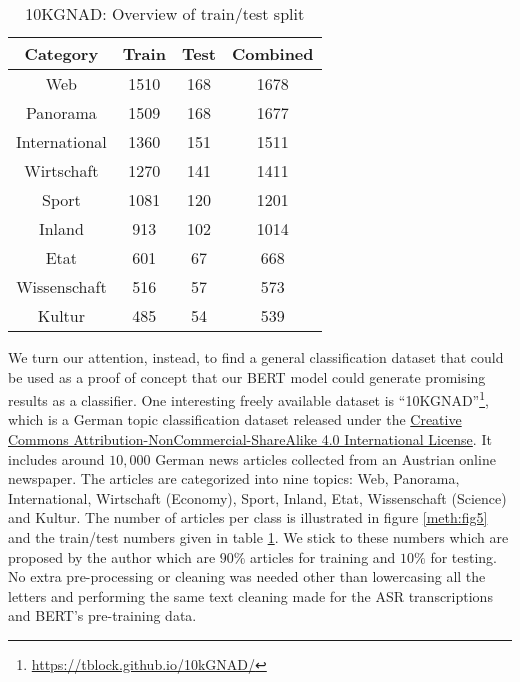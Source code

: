 \begin{table}[!ht]
	\centering
	\begin{tabular}{|c|c|c|c|}
		\hline
		Category		& Train	& Test  & Combined  \\ \hline
		Web				& 1510 	& 168	& 1678 		\\ \hline
		Panorama 		& 1509 	& 168	& 1677		\\ \hline
		International 	& 1360	& 151	& 1511		\\ \hline
		Wirtschaft 		& 1270	& 141	& 1411		\\ \hline
		Sport 			& 1081	& 120	& 1201		\\ \hline
		Inland 			& 913	& 102	& 1014		\\ \hline
		Etat 			& 601	& 67	& 668		\\ \hline
		Wissenschaft 	& 516	& 57	& 573		\\ \hline
		Kultur 			& 485	& 54	& 539		\\ \hline
		
	\end{tabular}
	\caption{10KGNAD: Overview of train/test split}
	\label{meth:table5}
\end{table}



We turn our attention, instead, to find a general classification dataset that could be used as a proof of concept that our \ac{BERT} model could generate promising results as a classifier. One interesting freely available dataset is \enquote{\ac{10KGNAD}}\footnote{\url{https://tblock.github.io/10kGNAD/}}, which is a German topic classification dataset released under the \href{https://creativecommons.org/licenses/by-nc-sa/4.0/}{Creative Commons Attribution-NonCommercial-ShareAlike 4.0 International License}. It includes around $10,000$ German news articles collected from an Austrian online newspaper. The articles are categorized into nine topics: Web, Panorama, International, Wirtschaft (Economy), Sport, Inland, Etat, Wissenschaft (Science) and Kultur. The number of articles per class is illustrated in figure \ref{meth:fig5} and the train/test numbers given in table \ref{meth:table5}. We stick to these numbers which are proposed by the author which are $90\%$ articles for training and $10\%$ for testing. No extra pre-processing or cleaning was needed other than lowercasing all the letters and performing the same text cleaning made for the \ac{ASR} transcriptions and \ac{BERT}'s pre-training data.


